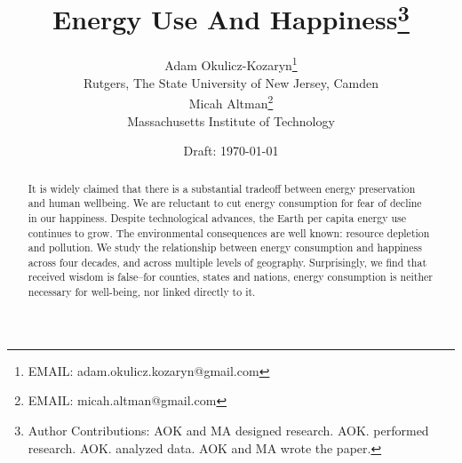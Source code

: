\documentclass[10pt, letterpaper]{article}
\date{Draft: {}\today}
\title{
Energy Use And Happiness\footnote{Author Contributions: AOK and MA designed
  research. AOK. performed research. AOK. analyzed data. AOK and
  MA wrote the paper.  %
}
}
\author{
Adam Okulicz-Kozaryn\thanks{EMAIL: adam.okulicz.kozaryn@gmail.com
  \hfill %
} \\
{\small Rutgers, The State University of New Jersey, Camden}\\
Micah Altman\thanks{EMAIL: micah.altman@gmail.com
  \hfill } \\
{\small Massachusetts Institute of Technology}
}
\begin{document}


\maketitle
\vspace{-.4in}
\begin{center}

\end{center}

\begin{abstract}
\noindent  


It is widely claimed that there is a substantial tradeoff between energy
 preservation and human wellbeing. We are reluctant to cut energy
 consumption for fear of decline in our happiness. 
Despite technological advances, the Earth per capita energy use continues to grow.
The environmental consequences %
are well known:
resource depletion and pollution. %
%
 We study the relationship between energy consumption and happiness across four decades, and across multiple levels of geography.  Surprisingly, we find that received wisdom is false--for counties, states and nations, energy consumption is neither necessary for well-being, nor linked directly to it. 



\end{abstract}


\vspace{.15in} 
\end{document}
